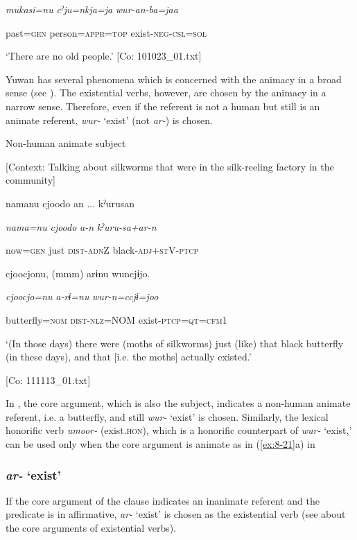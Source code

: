       \textit{mukasi=nu}  \textit{cˀju=nkja=ja}  \textit{wur{}-an-ba=jaa}

      past=\textsc{gen}  person=\textsc{appr}=\textsc{top}  exist-\textsc{neg}-\textsc{csl}=\textsc{sol}

\glt ‘There are no old people.’ [Co: 101023\_01.txt]
\z

Yuwan has several phenomena which is concerned with the animacy in a broad sense (see ). The existential verbs, however, are chosen by the animacy in a narrow sense. Therefore, even if the referent is not a human but still is an animate referent, \textit{wur-} ‘exist’ (not \textit{ar-}) is chosen.

\textbf{\ea\label{ex:8-29}
}  Non-human animate subject

  [Context: Talking about silkworms that were in the silk-reeling factory in the community]

  {\TM}
\glll  namanu  cjoodo  an ...  kˀurusan

    \textit{nama=nu}  \textit{cjoodo}  \textit{a-n}  \textit{kˀuru-sa+ar-n}

    now=\textsc{gen}  just  \textsc{dist}-\textsc{adn}Z  black-\textsc{adj}+\textsc{st}V-\textsc{ptcp}

    cjoocjonu,  (mmm)  arɨnu  wuncjɨjo.

    \textit{cjoocjo=nu}    \textit{a-rɨ=nu}  \textit{wur{}-n=ccjɨ=joo}

    butterfly=\textsc{nom}    \textsc{dist}-\textsc{nlz}=NOM  exist-\textsc{ptcp}=\textsc{qt}=\textsc{cfm1}

    ‘(In those days) there were (moths of silkworms) just (like) that black butterfly (in these days), and that [i.e. the moths] actually existed.’

    [Co: 111113\_01.txt]
\z

In , the core argument, which is also the subject, indicates a non-human animate referent, i.e. a butterfly, and still \textit{wur-} ‘exist’ is chosen. Similarly, the lexical honorific verb \textit{umoor-} (exist.\textsc{hon}), which is a honorific counterpart of \textit{wur-} ‘exist,’ can be used only when the core argument is animate as in (\ref{ex:8-21}a) in 

\subsubsection{\textit{ar-} ‘exist’}

If the core argument of the clause indicates an inanimate referent and the predicate is in affirmative, \textit{ar-} ‘exist’ is chosen as the existential verb (see  about the core arguments of existential verbs).

